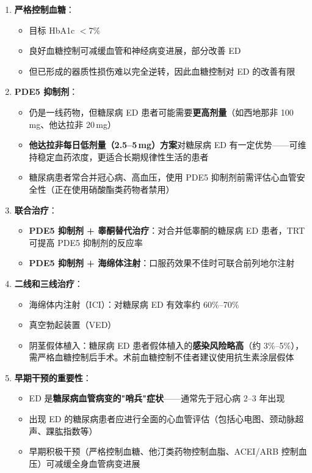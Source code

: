 \begin{enumerate}
	\item \textbf{严格控制血糖}：
	\begin{itemize}
		\item 目标 HbA1c $<7\%$
		\item 良好血糖控制可减缓血管和神经病变进展，部分改善 ED
		\item 但已形成的器质性损伤难以完全逆转，因此血糖控制对 ED 的改善有限
	\end{itemize}

	\item \textbf{PDE5 抑制剂}：
	\begin{itemize}
		\item 仍是一线药物，但糖尿病 ED 患者可能需要\textbf{更高剂量}（如西地那非 100\,mg、他达拉非 20\,mg）
		\item \textbf{他达拉非每日低剂量（2.5--5\,mg）方案}对糖尿病 ED 有一定优势——可维持稳定血药浓度，更适合长期规律性生活的患者
		\item 糖尿病患者常合并冠心病、高血压，使用 PDE5 抑制剂前需评估心血管安全性（正在使用硝酸酯类药物者禁用）
	\end{itemize}

	\item \textbf{联合治疗}：
	\begin{itemize}
		\item \textbf{PDE5 抑制剂 + 睾酮替代治疗}：对合并低睾酮的糖尿病 ED 患者，TRT 可提高 PDE5 抑制剂的反应率
		\item \textbf{PDE5 抑制剂 + 海绵体注射}：口服药效果不佳时可联合前列地尔注射
	\end{itemize}

	\item \textbf{二线和三线治疗}：
	\begin{itemize}
		\item 海绵体内注射（ICI）：对糖尿病 ED 有效率约 60\%--70\%
		\item 真空勃起装置（VED）
		\item 阴茎假体植入：糖尿病 ED 患者假体植入的\textbf{感染风险略高}（约 3\%--5\%），需严格血糖控制后手术。术前血糖控制不佳者建议使用抗生素涂层假体
	\end{itemize}

	\item \textbf{早期干预的重要性}：
	\begin{itemize}
		\item ED 是\textbf{糖尿病血管病变的"哨兵"症状}——通常先于冠心病 2--3 年出现
		\item 出现 ED 的糖尿病患者应进行全面的心血管评估（包括心电图、颈动脉超声、踝肱指数等）
		\item 早期积极干预（严格控制血糖、他汀类药物控制血脂、ACEI/ARB 控制血压）可减缓全身血管病变进展
	\end{itemize}
\end{enumerate}

